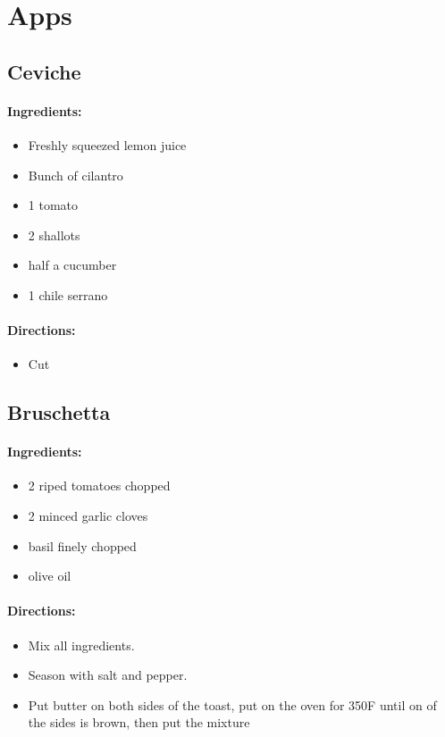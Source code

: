 \documentclass{article}
\begin{document}
\section{Apps}

\subsection{Ceviche}

\paragraph{Ingredients:}

\begin{itemize}
	\item Freshly squeezed lemon juice
	\item Bunch of cilantro
	\item 1 tomato
	\item 2 shallots
	\item half a cucumber
	\item 1 chile serrano 
\end{itemize}

\paragraph{Directions:}
\begin{itemize}
	\item Cut
\end{itemize}

\subsection{Bruschetta}

\paragraph{Ingredients:}

\begin{itemize}
	\item 2 riped tomatoes chopped
	\item 2 minced garlic cloves
	\item basil finely chopped
	\item olive oil
\end{itemize}

\paragraph{Directions:}
\begin{itemize}
	\item Mix all ingredients.
	\item Season with salt and pepper.
	\item Put butter on both sides of the toast, put on the oven for 350F until on of the sides is brown, then put the mixture
\end{itemize}
\end{document}

